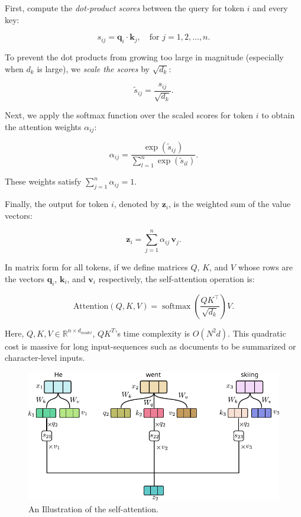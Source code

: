 First, compute the \textit{dot-product scores} between the query for token \( i \) and every key:

\[
s_{ij} = \mathbf{q}_i \cdot \mathbf{k}_j, \quad \text{for } j = 1, 2, \dots, n.
\]

To prevent the dot products from growing too large in magnitude (especially when \( d_k \) is large), we \textit{scale the scores} by \( \sqrt{d_k} \):

\[
\tilde{s}_{ij} = \frac{s_{ij}}{\sqrt{d_k}}.
\]

Next, we apply the softmax function over the scaled scores for token \( i \) to obtain the attention weights \( \alpha_{ij} \):

\[
\alpha_{ij} = \frac{\exp(\tilde{s}_{ij})}{\displaystyle \sum_{l=1}^{n} \exp(\tilde{s}_{il})}.
\]

These weights satisfy \( \sum_{j=1}^{n} \alpha_{ij} = 1 \).

Finally, the output for token \( i \), denoted by \( \mathbf{z}_i \), is the weighted sum of the value vectors:

\[
\mathbf{z}_i = \sum_{j=1}^{n} \alpha_{ij} \, \mathbf{v}_j.
\]

In matrix form for all tokens, if we define matrices \( Q \), \( K \), and \( V \) whose rows are the vectors \( \mathbf{q}_i \), \( \mathbf{k}_i \), and \( \mathbf{v}_i \) respectively, the self-attention operation is:

\[
\text{Attention}(Q, K, V) = \operatorname{softmax}\!\left(\frac{QK^\top}{\sqrt{d_k}}\right) V.
\]

Here, $Q, K, V\in \mathbb{R}^{n\times d_{model}}$, $QK^T$'s time complexity is $O(N^2d)$. This quadratic cost is massive for long input-sequences such as documents to be summarized or character-level inputs.

\begin{figure}[t]
	\centering
	\includegraphics[scale=1.0]{./images/transformer/attention.pdf}
	\caption{An Illustration of the self-attention.}
\end{figure}

